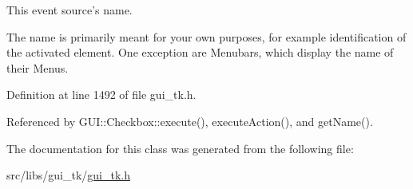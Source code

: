 This event source's name. 

The name is primarily meant for your own purposes, for example identification of the activated element. One exception are Menubars, which display the name of their Menus. 

Definition at line 1492 of file gui\-\_\-tk.\-h.



Referenced by G\-U\-I\-::\-Checkbox\-::execute(), execute\-Action(), and get\-Name().



The documentation for this class was generated from the following file\-:\begin{DoxyCompactItemize}
\item 
src/libs/gui\-\_\-tk/\hyperlink{gui__tk_8h}{gui\-\_\-tk.\-h}\end{DoxyCompactItemize}
